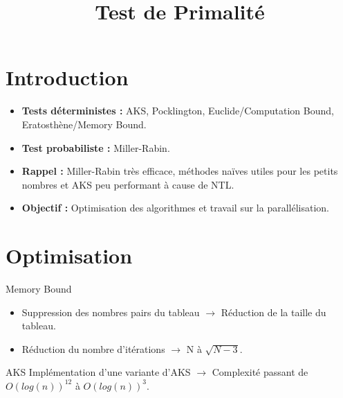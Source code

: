 
\usepackage{../tex/myInfolines}
\usepackage{graphicx}
\usepackage{algorithm}
\usepackage{algorithmic}
\usepackage{subcaption}
\usepackage{longtable,array}
\newenvironment{figure*}%
{\begin{figure}}
{\end{figure}}
\title{Test de Primalité}


	\begin{frame}
		\titlepage
	\end{frame}
	
	\section*{Introduction}
        \begin{frame}
        \begin{itemize}
        \item \textbf{Tests déterministes :} AKS, Pocklington, Euclide/Computation Bound, Eratosthène/Memory Bound.
        \vspace{1.5em}
        \item \textbf{Test probabiliste :} Miller-Rabin.
        \vspace{1.5em}
        \item \textbf{Rappel :} Miller-Rabin très efficace, méthodes naïves utiles pour les petits nombres et AKS peu performant à cause de NTL.
        \vspace{1.5em}
        \item \textbf{Objectif :} Optimisation des algorithmes et travail sur la parallélisation.
        \end{itemize}
                    
        \end{frame}

	\begin{frame}
		\tableofcontents
	\end{frame}
	
	\section{Optimisation}
	\begin{frame}	
 		  \begin{block}{Memory Bound}
   \begin{itemize}
\item Suppression des nombres pairs du tableau $\rightarrow$ Réduction de la taille du tableau.
\item Réduction du nombre d'itérations $\rightarrow$ N à $\sqrt{N-3}$.
\end{itemize}
   \end{block}
   \vspace{2em}
   \begin{block}{AKS}
   Implémentation d'une variante d'AKS $\rightarrow$ Complexité passant de $O(log(n))^{12}$ à $O(log(n))^{3}$.
    \end{block}
	\end{frame}
	
